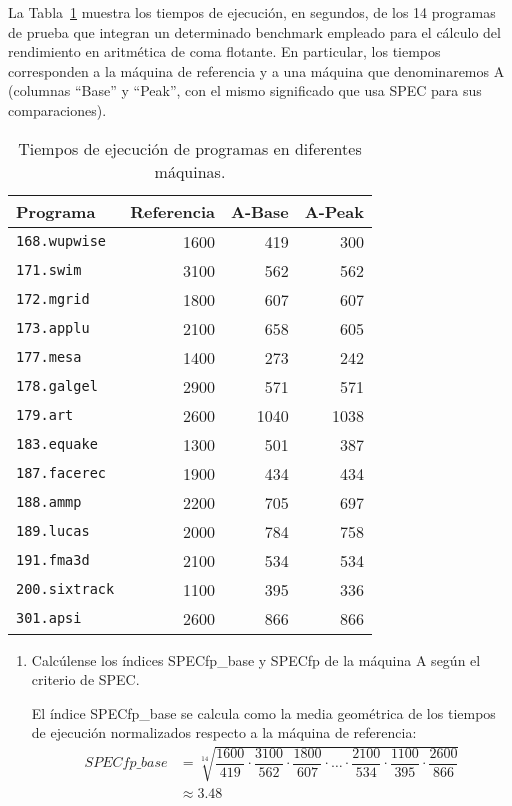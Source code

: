 \begin{ejercicio}\label{ej:4.5}
La Tabla~\ref{tab:ej:4.5} muestra los tiempos de ejecución, en segundos, de los 14 programas de prueba que integran un determinado benchmark empleado para el cálculo del rendimiento en aritmética de coma flotante. En particular, los tiempos corresponden a la máquina de referencia y a una máquina que denominaremos A (columnas ``Base'' y ``Peak'', con el mismo significado que usa SPEC para sus comparaciones).
\begin{table}[h]
\centering
\begin{tabular}{@{}lrrr@{}}
\toprule
Programa & Referencia & A-Base & A-Peak \\ \midrule
\verb|168.wupwise| & 1600 & 419 & 300 \\
\verb|171.swim| & 3100 & 562 & 562 \\
\verb|172.mgrid| & 1800 & 607 & 607 \\
\verb|173.applu| & 2100 & 658 & 605 \\
\verb|177.mesa| & 1400 & 273 & 242 \\
\verb|178.galgel| & 2900 & 571 & 571 \\
\verb|179.art| & 2600 & 1040 & 1038 \\
\verb|183.equake| & 1300 & 501 & 387 \\
\verb|187.facerec| & 1900 & 434 & 434 \\
\verb|188.ammp| & 2200 & 705 & 697 \\
\verb|189.lucas| & 2000 & 784 & 758 \\
\verb|191.fma3d| & 2100 & 534 & 534 \\
\verb|200.sixtrack| & 1100 & 395 & 336 \\
\verb|301.apsi| & 2600 & 866 & 866 \\ \bottomrule
\end{tabular}
\caption{Tiempos de ejecución de programas en diferentes máquinas.}
\label{tab:ej:4.5}
\end{table}
\begin{enumerate}
    \item Calcúlense los índices SPECfp\_base y SPECfp de la máquina A según el criterio de SPEC.
    
    El índice SPECfp\_base se calcula como la media geométrica de los tiempos de ejecución normalizados respecto a la máquina de referencia:
    \begin{align*}
        SPECfp\_base &= \sqrt[14]{\dfrac{1600}{419} \cdot \dfrac{3100}{562} \cdot \dfrac{1800}{607} \cdot \dots\cdot \dfrac{2100}{534} \cdot \dfrac{1100}{395} \cdot \dfrac{2600}{866}}\\
        &\approx 3.48
    \end{align*}


\end{enumerate}
\end{ejercicio}
